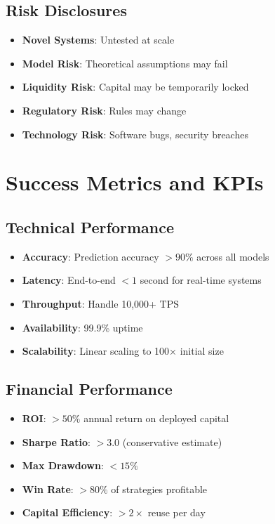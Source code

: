 \documentclass[12pt]{article}
\begin{document}
\subsection{Risk Disclosures}

\begin{itemize}
    \item \textbf{Novel Systems}: Untested at scale
    \item \textbf{Model Risk}: Theoretical assumptions may fail
    \item \textbf{Liquidity Risk}: Capital may be temporarily locked
    \item \textbf{Regulatory Risk}: Rules may change
    \item \textbf{Technology Risk}: Software bugs, security breaches
\end{itemize}

\section{Success Metrics and KPIs}

\subsection{Technical Performance}

\begin{itemize}
    \item \textbf{Accuracy}: Prediction accuracy $> 90\%$ across all models
    \item \textbf{Latency}: End-to-end $< 1$ second for real-time systems
    \item \textbf{Throughput}: Handle 10,000+ TPS
    \item \textbf{Availability}: 99.9\% uptime
    \item \textbf{Scalability}: Linear scaling to 100× initial size
\end{itemize}

\subsection{Financial Performance}

\begin{itemize}
    \item \textbf{ROI}: $> 50\%$ annual return on deployed capital
    \item \textbf{Sharpe Ratio}: $> 3.0$ (conservative estimate)
    \item \textbf{Max Drawdown}: $< 15\%$
    \item \textbf{Win Rate}: $> 80\%$ of strategies profitable
    \item \textbf{Capital Efficiency}: $> 2×$ reuse per day
\end{itemize}
\end{document}
